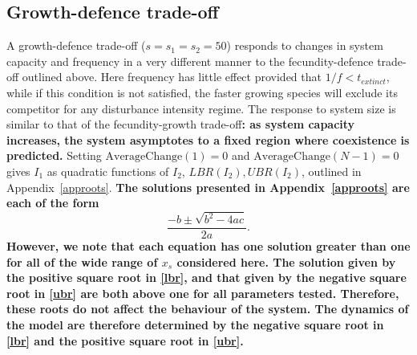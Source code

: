 \subsection{Growth-defence trade-off}
A growth-defence trade-off ($s=s_1=s_2=50$) responds to changes in system capacity and frequency in a very different manner to the fecundity-defence trade-off outlined above. Here frequency has little effect provided that $1/f<t_{extinct}$, while if this condition is not satisfied, the faster growing species will exclude its competitor for any disturbance intensity regime. The response to system size is similar to that of the fecundity-growth trade-off\textbf{: as system capacity increases, the system asymptotes to a fixed region where coexistence is predicted.} Setting $\text{AverageChange}(1)=0$ and $\text{AverageChange}(N-1)=0$ gives $I_1$ as quadratic functions of $I_2$, $LBR(I_2), UBR(I_2)$, outlined in Appendix~\ref{approots}.
\textbf{The solutions presented in Appendix~\ref{approots} are each of the form
$$
\frac{-b\pm \sqrt{b^2-4ac}}{2a}.
$$ 
However, we note that each equation has one solution greater than one for all of the wide range of $x_s$ considered here. The solution given by the positive square root in \eqref{lbr}, and that given by the negative square root in \eqref{ubr} are both above one for all parameters tested. Therefore, these roots do not affect the behaviour of the system. The dynamics of the model are therefore determined by the negative square root in \eqref{lbr} and the positive square root in \eqref{ubr}.}
